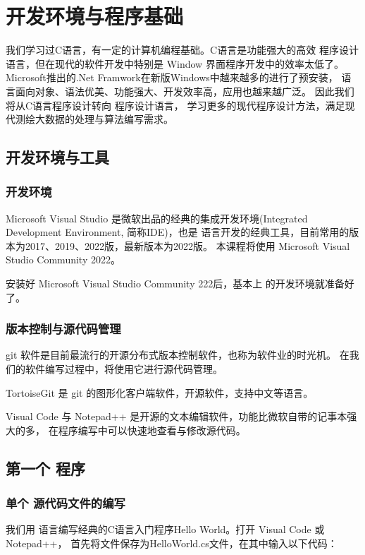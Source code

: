 
\chapter{ \cs 开发环境与程序基础}

我们学习过C语言，有一定的计算机编程基础。C语言是功能强大的高效
程序设计语言，但在现代的软件开发中特别是 Window 界面程序开发中的效率太低了。
Microsoft推出的.Net Framwork在新版Windows中越来越多的进行了预安装，
 \cs 语言面向对象、语法优美、功能强大、开发效率高，应用也越来越广泛。
因此我们将从C语言程序设计转向 \cs 程序设计语言，
学习更多的现代程序设计方法，满足现代测绘大数据的处理与算法编写需求。

\section{ \cs  开发环境与工具}

\subsection{ \cs  开发环境}
Microsoft Visual Studio 是微软出品的经典的集成开发环境(Integrated Development Environment,
简称IDE)，也是 \cs 语言开发的经典工具，目前常用的版本为2017、2019、2022版，最新版本为2022版。
本课程将使用 Microsoft Visual Studio Community 2022。

安装好 Microsoft Visual Studio Community 222后，基本上 \cs  的开发环境就准备好了。

\subsection{版本控制与源代码管理}
git 软件是目前最流行的开源分布式版本控制软件，也称为软件业的时光机。
在我们的软件编写过程中，将使用它进行源代码管理。

TortoiseGit 是 git 的图形化客户端软件，开源软件，支持中文等语言。

Visual Code 与  Notepad++ 是开源的文本编辑软件，功能比微软自带的记事本强大的多，
在程序编写中可以快速地查看与修改源代码。


\section{第一个 \cs  程序}

\subsection{单个 \cs  源代码文件的编写}
我们用 \cs 语言编写经典的C语言入门程序Hello World。打开 Visual Code 或 Notepad++，
首先将文件保存为HelloWorld.cs文件，在其中输入以下代码：

